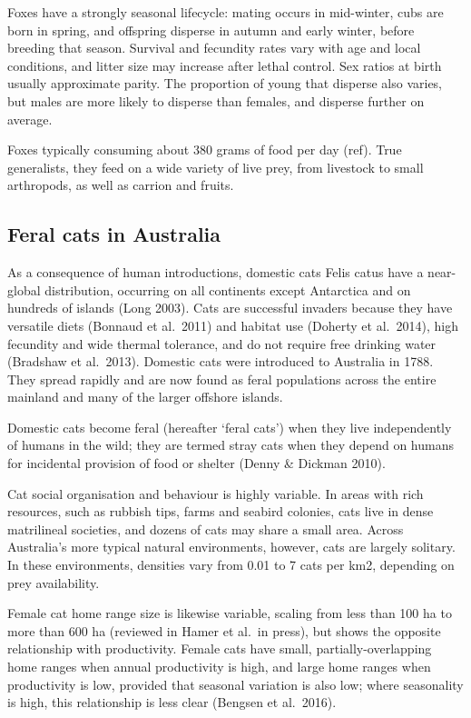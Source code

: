 \documentclass[11pt,a4paper,titlepage,twoside,openright]{style/unimelbthesis}
\begin{document}
\begin{mainmatter}
Foxes have a strongly seasonal lifecycle: mating occurs in mid-winter, cubs are born in spring, and offspring disperse in autumn and early winter, before breeding that season. Survival and fecundity rates vary with age and local conditions, and litter size may increase after lethal control. Sex ratios at birth usually approximate parity. The proportion of young that disperse also varies, but males are more likely to disperse than females, and disperse further on average.

Foxes typically consuming about 380 grams of food per day (ref). True generalists, they feed on a wide variety of live prey, from livestock to small arthropods, as well as carrion and fruits.

\hypertarget{feral-cats-in-australia}{%
\subsection{Feral cats in Australia}\label{feral-cats-in-australia}}

As a consequence of human introductions, domestic cats Felis catus have a near-global distribution, occurring on all continents except Antarctica and on hundreds of islands (Long 2003). Cats are successful invaders because they have versatile diets (Bonnaud et al.~2011) and habitat use (Doherty et al.~2014), high fecundity and wide thermal tolerance, and do not require free drinking water (Bradshaw et al.~2013). Domestic cats were introduced to Australia in 1788. They spread rapidly and are now found as feral populations across the entire mainland and many of the larger offshore islands.

Domestic cats become feral (hereafter `feral cats') when they live independently of humans in the wild; they are termed stray cats when they depend on humans for incidental provision of food or shelter (Denny \& Dickman 2010).

Cat social organisation and behaviour is highly variable. In areas with rich resources, such as rubbish tips, farms and seabird colonies, cats live in dense matrilineal societies, and dozens of cats may share a small area. Across Australia's more typical natural environments, however, cats are largely solitary. In these environments, densities vary from 0.01 to 7 cats per km2, depending on prey availability.

Female cat home range size is likewise variable, scaling from less than 100 ha to more than 600 ha (reviewed in Hamer et al.~in press), but shows the opposite relationship with productivity. Female cats have small, partially-overlapping home ranges when annual productivity is high, and large home ranges when productivity is low, provided that seasonal variation is also low; where seasonality is high, this relationship is less clear (Bengsen et al.~2016).


\end{mainmatter}
\end{document}
